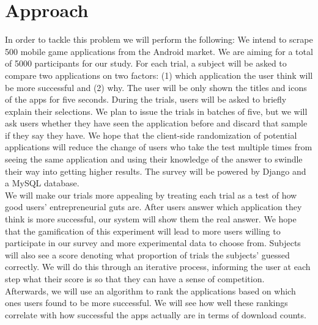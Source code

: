 \section{Approach}

In order to tackle this problem we will perform the following: We intend to scrape 500 mobile game applications from the Android market. We are aiming for a total of 5000 participants for our study. For each trial, a subject will be asked to compare two applications on two factors: (1) which application the user think will be more successful and (2) why. The user will be only shown the titles and icons of the apps for five seconds. During the trials, users will be asked to briefly explain their selections. We plan to issue the trials in batches of five, but we will ask users whether they have seen the application before and discard that sample if they say they have. We hope that the client-side randomization of potential applications will reduce the change of users who take the test multiple times from seeing the same application and using their knowledge of the answer to swindle their way into getting higher results. The survey will be powered by Django and a MySQL database.\\

We will make our trials more appealing by treating each trial as a test of how good users' entrepreneurial guts are. After users answer which application they think is more successful, our system will show them the real answer. We hope that the gamification of this experiment will lead to more users willing to participate in our survey and more experimental data to choose from. Subjects will also see a score denoting what proportion of trials the subjects' guessed correctly. We will do this through an iterative process, informing the user at each step what their score is so that they can have a sense of competition.\\

Afterwards, we will use an algorithm to rank the applications based on which ones users found to be more successful. We will see how well these rankings correlate with how successful the apps actually are in terms of download counts.


